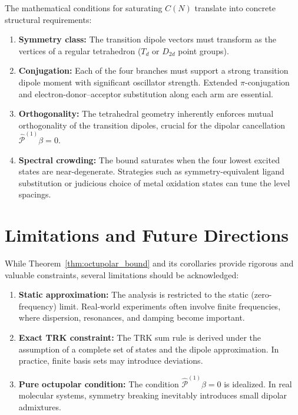 \documentclass[11pt]{article}
\newcommand{\Proj}[1]{\hat{\mathcal{P}}^{(#1)}}
\begin{document}
The mathematical conditions for saturating $C(N)$ translate into concrete structural requirements:

\begin{enumerate}
    \item \textbf{Symmetry class:} The transition dipole vectors must transform as the vertices of a regular tetrahedron ($T_d$ or $D_{2d}$ point groups).
    
    \item \textbf{Conjugation:} Each of the four branches must support a strong transition dipole moment with significant oscillator strength. Extended $\pi$-conjugation and electron-donor--acceptor substitution along each arm are essential.
    
    \item \textbf{Orthogonality:} The tetrahedral geometry inherently enforces mutual orthogonality of the transition dipoles, crucial for the dipolar cancellation $\Proj{1}\beta=0$.
    
    \item \textbf{Spectral crowding:} The bound saturates when the four lowest excited states are near-degenerate. Strategies such as symmetry-equivalent ligand substitution or judicious choice of metal oxidation states can tune the level spacings.
\end{enumerate}

\section{Limitations and Future Directions}

While Theorem~\ref{thm:octupolar_bound} and its corollaries provide rigorous and valuable constraints, several limitations should be acknowledged:

\begin{enumerate}
    \item \textbf{Static approximation:} The analysis is restricted to the static (zero-frequency) limit. Real-world experiments often involve finite frequencies, where dispersion, resonances, and damping become important.
    
    \item \textbf{Exact TRK constraint:} The TRK sum rule is derived under the assumption of a complete set of states and the dipole approximation. In practice, finite basis sets may introduce deviations.
    
    \item \textbf{Pure octupolar condition:} The condition $\Proj{1}\beta = 0$ is idealized. In real molecular systems, symmetry breaking inevitably introduces small dipolar admixtures.
\end{enumerate}
\end{document}
